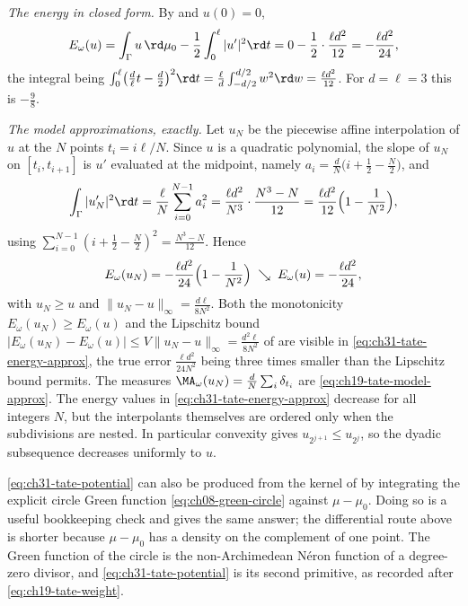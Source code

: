 \begin{example}
\emph{The energy in closed form.}  By  and
\(u(0)=0\),
\begin{equation}
\label{eq:ch31-tate-energy}
 E_\omega(u)=\int_\Gamma u\,\rd\mu_0-\frac12\int_0^\ell|u'|^2\rd t
 =0-\frac12\cdot\frac{\ell d^2}{12}
 =-\frac{\ell d^2}{24},
\end{equation}
the integral being
\(\int_0^\ell\bigl(\tfrac d\ell t-\tfrac d2\bigr)^2\rd t
 =\tfrac\ell d\int_{-d/2}^{d/2}w^2\rd w=\tfrac{\ell d^2}{12}\).
For \(d=\ell=3\) this is \(-\tfrac98\).

\emph{The model approximations, exactly.}  Let \(u_N\) be the piecewise
affine interpolation of \(u\) at the \(N\) points \(t_i=i\ell/N\).  Since
\(u\) is a quadratic polynomial, the slope of \(u_N\) on
\([t_i,t_{i+1}]\) is \(u'\) evaluated at the midpoint, namely
\(a_i=\tfrac dN\bigl(i+\tfrac12-\tfrac N2\bigr)\), and
\[
 \int_\Gamma|u_N'|^2\rd t
 =\frac\ell N\sum_{i=0}^{N-1}a_i^2
 =\frac{\ell d^2}{N^3}\cdot\frac{N^3-N}{12}
 =\frac{\ell d^2}{12}\Bigl(1-\frac1{N^2}\Bigr),
\]
using \(\sum_{i=0}^{N-1}(i+\tfrac12-\tfrac N2)^2=\tfrac{N^3-N}{12}\).
Hence
\begin{equation}
\label{eq:ch31-tate-energy-approx}
 E_\omega(u_N)=-\frac{\ell d^2}{24}\Bigl(1-\frac1{N^2}\Bigr)
 \;\searrow\;E_\omega(u)=-\frac{\ell d^2}{24},
\end{equation}
with \(u_N\geq u\) and \(\|u_N-u\|_\infty=\tfrac{d\ell}{8N^2}\).  Both the
monotonicity \(E_\omega(u_N)\geq E_\omega(u)\) and the Lipschitz bound
\(|E_\omega(u_N)-E_\omega(u)|\leq V\|u_N-u\|_\infty=\tfrac{d^2\ell}{8N^2}\)
of  are visible in
\eqref{eq:ch31-tate-energy-approx}, the true error \(\tfrac{\ell d^2}{24N^2}\)
being three times smaller than the Lipschitz bound permits.  The measures
\(\MA_\omega(u_N)=\tfrac dN\sum_i\delta_{t_i}\) are
\eqref{eq:ch19-tate-model-approx}.  The energy values in
\eqref{eq:ch31-tate-energy-approx} decrease for all integers \(N\), but the
interpolants themselves are ordered only when the subdivisions are nested.
In particular convexity gives \(u_{2^{j+1}}\leq u_{2^j}\), so the dyadic
subsequence decreases uniformly to \(u\).
\end{example}

\begin{remark}
\label{rem:ch31-circle-green}
\eqref{eq:ch31-tate-potential} can also be produced from the kernel of
 by integrating the explicit circle Green
function \eqref{eq:ch08-green-circle} against \(\mu-\mu_0\).  Doing so is a
useful bookkeeping check and gives the same answer; the differential
route above is shorter because \(\mu-\mu_0\) has a density on the
complement of one point.  The Green function of the circle is the
non-Archimedean N\'eron function of a degree-zero divisor, and
\eqref{eq:ch31-tate-potential} is its second primitive, as recorded after
\eqref{eq:ch19-tate-weight}.
\end{remark}

